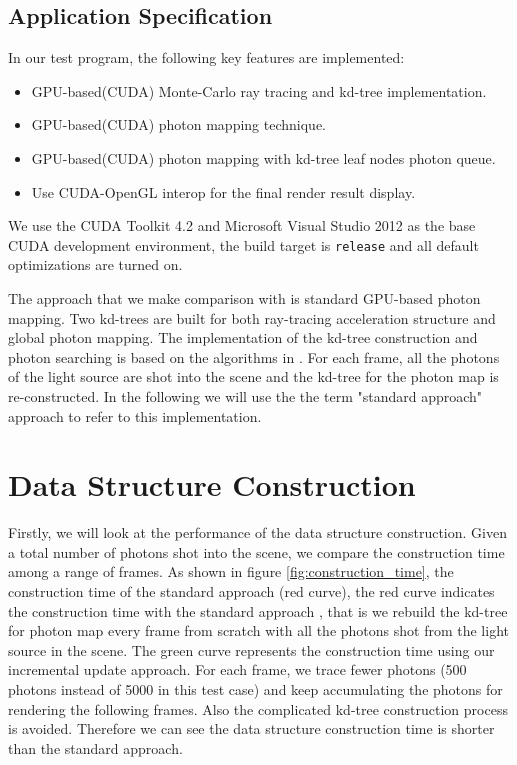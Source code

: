 \subsection{Application Specification}

In our test program, the following key features are implemented:

\begin{itemize}

\item{GPU-based(CUDA) Monte-Carlo ray tracing and kd-tree implementation.}

\item{GPU-based(CUDA) photon mapping technique. }

\item{GPU-based(CUDA) photon mapping with kd-tree leaf nodes photon queue.}

\item{Use CUDA-OpenGL interop for the final render result display. }

\end{itemize}

We use the CUDA Toolkit 4.2 and Microsoft Visual Studio 2012 as the base CUDA development environment, the build target is {\tt release} and all default optimizations are turned on.

The approach that we make comparison with is standard GPU-based photon mapping. Two kd-trees are built for both ray-tracing acceleration structure and global photon mapping. The implementation of the kd-tree construction and photon searching is based on the algorithms in \cite{Zhou2008}. For each frame, all the photons of the light source are shot into the scene and the kd-tree for the photon map is re-constructed. In the following we will use the the term "standard approach" approach to refer to this implementation.


\section{Data Structure Construction}
\label{sec:build_time}

Firstly, we will look at the performance of the data structure construction. Given a total number of photons shot into the scene, we compare the construction time among a range of frames. As shown in figure \ref{fig:construction_time}, the construction time of the standard approach (red curve), the red curve indicates the construction time with the standard approach , that is we rebuild the kd-tree for photon map every frame from scratch with all the photons shot from the light source in the scene. The green curve represents the construction time using our incremental update approach. For each frame, we trace fewer photons (500 photons instead of 5000 in this test case) and keep accumulating the photons for rendering the following frames. Also the complicated kd-tree construction process is avoided. Therefore we can see the data structure construction time is shorter than the standard approach.

